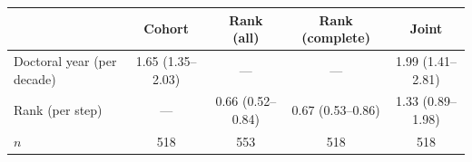 \begin{tabular}{lcccc}
\toprule
 & Cohort & Rank (all) & Rank (complete) & Joint \\
\midrule
Doctoral year (per decade) & 1.65 (1.35--2.03) & --- & --- & 1.99 (1.41--2.81) \\
Rank (per step) & --- & 0.66 (0.52--0.84) & 0.67 (0.53--0.86) & 1.33 (0.89--1.98) \\
$n$ & 518 & 553 & 518 & 518 \\
\bottomrule
\end{tabular}
